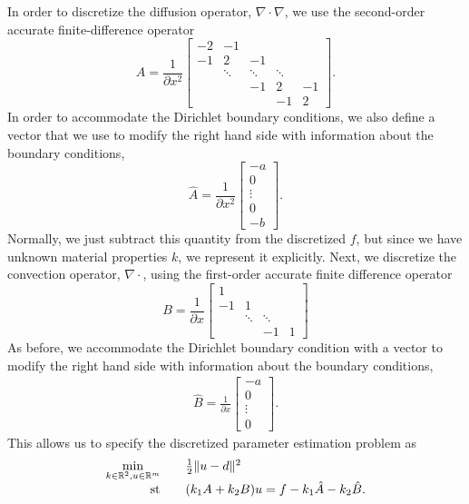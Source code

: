 \documentclass{report}
\newcommand{\re}{\mathbb{R}}
\newcommand{\st}{\textnormal{st}}
\begin{document}
        In order to discretize the diffusion operator, $\nabla\cdot\nabla$, we use the second-order accurate finite-difference operator
$$
        A = \frac{1}{\partial x^2} \begin{bmatrix}
            -2 & -1\\
            -1 & 2 & -1\\
            & \ddots & \ddots & \ddots\\
            & & -1 & 2 & -1\\
            & & & -1 & 2
        \end{bmatrix}.
$$
In order to accommodate the Dirichlet boundary conditions, we also define a vector that we use to modify the right hand side with information about the boundary conditions,
$$
        \hat{A} = \frac{1}{\partial x^2} \begin{bmatrix}
            -a\\
            0\\
            \vdots\\
            0\\
            -b
        \end{bmatrix}.
$$
Normally, we just subtract this quantity from the discretized $f$, but since we have unknown material properties $k$, we represent it explicitly.  Next, we discretize the convection operator, $\nabla\cdot$, using the first-order accurate finite difference operator
$$
        B = \frac{1}{\partial x} \begin{bmatrix}
            1 \\
            -1 & 1 \\
            & \ddots & \ddots \\
            & & -1 & 1
        \end{bmatrix}
$$
As before, we accommodate the Dirichlet boundary condition with a vector to modify the right hand side with information about the boundary conditions,
\begin{align*}
        \hat{B} = \frac{1}{\partial x} \begin{bmatrix}
            -a\\
            0\\
            \vdots\\
            0
        \end{bmatrix}.
\end{align*}
This allows us to specify the discretized parameter estimation problem as
$$\begin{array}{rcl}
        \min\limits_{k\in\re^2,u\in\re^m}  && \frac{1}{2} \| u - d \|^2 \\
        \st && (k_1 A + k_2 B)u = f - k_1 \hat{A} - k_2 \hat{B}.
\end{array}$$
\end{document}
